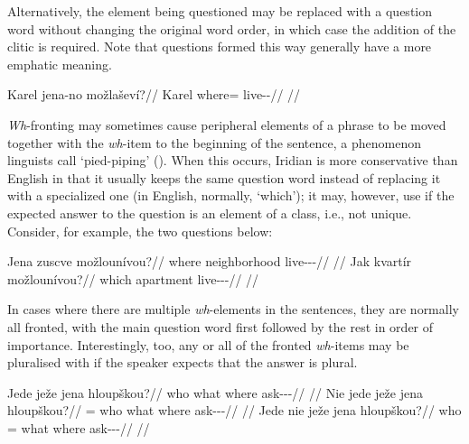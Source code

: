 Alternatively, the element being questioned may be replaced with a question word without changing the original word order, in which case the addition of the clitic  is required. Note that questions formed this way generally have a more emphatic meaning.

\pex
\begingl
\gla Karel jena-no mo\v{z}la\v{s}ev\'i?//
\glb Karel where=\Q{} live-\Av{}-\Cont{}//
\glft {}//
\endgl
\xe


\emph{Wh}-fronting may sometimes cause peripheral elements of a phrase to be moved together with the \emph{wh}-item to the beginning of the sentence, a phenomenon linguists call `pied-piping' (\cite[263-4]{ross1967}). When this occurs, Iridian is more conservative than English in that it usually keeps the same question word instead of replacing it with a specialized one (in English, normally, `which'); it may, however, use  if the expected answer to the question is an element of a class, i.e., not unique. Consider, for example, the two questions below:

\pex
\a
\begingl
\gla Jena zuscve mo\v{z}loun\'ivou?//
\glb where neighborhood live-\Lv{}-\Cont{}-\Nz{}//
\glft {}//
\endgl
\a
\begingl
\gla Jak kvart\'ir mo\v{z}loun\'ivou?//
\glb which apartment live-\Lv{}-\Cont{}-\Nz{}//
\glft {}//
\endgl
\xe

In cases where there are multiple \emph{wh}-elements in the sentences, they are normally all fronted, with the main question word first followed by the rest in order of importance. Interestingly, too, any or all of the fronted \emph{wh}-items may be pluralised with  if the speaker expects that the answer is plural.

\pex
\a\begingl
\gla Jede je\v{z}e jena hloup\v{s}kou?//
\glb who what where ask-\Av{}-\Pf{}-\Nz{}//
\glft {}//
\endgl
\a\begingl
\gla Nie jede je\v{z}e jena hloup\v{s}kou?//
\glb \Pl{}= who what where ask-\Av{}-\Pf{}-\Nz{}//
\glft {}//
\endgl
\a\begingl
\gla Jede nie je\v{z}e jena hloup\v{s}kou?//
\glb who \Pl{}= what where ask-\Av{}-\Pf{}-\Nz{}//
\glft {}//
\endgl
\xe

